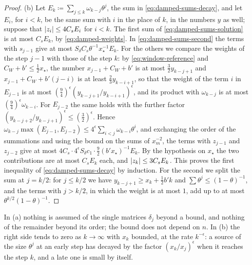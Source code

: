 \documentclass[11pt]{preprint}
\DeclarePairedDelimiter{\abs}{\lvert}{\rvert}
\numberwithin{equation}{section}
\theoremstyle{definition}
\theoremstyle{remark}
\theoremstyle{plain}
\begin{document}
\begin{proof}
(b) Let $E_k \coloneqq \sum_{j \leq k}\omega_{k-j}\theta^j$, the sum in \eqref{eq:damped-sums-decay}, and let $E_i$, for $i < k$, be the same sum with $i$ in the place of $k$, in the numbers $y$ as well; suppose that $\abs{z_i} \leq 4C_sE_i$ for $i < k$. The first sum of \eqref{eq:damped-sums-solution} is at most $C_sE_k$, by \eqref{eq:damped-weights}. In \eqref{eq:damped-sums-second} the terms with $s_{j-1}$ give at most $S_\delta C_s\theta^{-1}x_\star^{-1}E_k$. For the others we compare the weights of the step $j - 1$ with those of the step $k$: by \eqref{eq:window-reference} and $C_W + b' \leq \frac12x_\star$, the number $x_{j-1} + C_W + b'$ is at most $\frac32y_{k-j+1}$ and $x_{j-1} + C_W + b'(j - i)$ is at least $\frac23y_{k-i+1}$, so that the weight of the term $i$ in $E_{j-1}$ is at most $(\frac94)^\epsilon(y_{k-j+1}/y_{k-i+1})^\epsilon$, and its product with $\omega_{k-j}$ is at most $(\frac94)^\epsilon\omega_{k-i}$. For $E_{j-2}$ the same holds with the further factor $(y_{k-j+2}/y_{k-j+1})^\epsilon \leq (\frac32)^\epsilon$. Hence $\omega_{k-j}\max(E_{j-1}, E_{j-2}) \leq 4^\epsilon\sum_{i<j}\omega_{k-i}\theta^i$, and exchanging the order of the summations and using the bound on the sums of $x_m^{-2}$, the terms with $z_{j-1}$ and $z_{j-2}$ give at most $4C_s \cdot 4^\epsilon S_\delta c_1 \cdot \frac92(b'x_\star)^{-1}E_k$. By the hypothesis on $x_\star$ the two contributions are at most $C_sE_k$ each, and $\abs{z_k} \leq 3C_sE_k$. This proves the first inequality of \eqref{eq:damped-sums-decay} by induction. For the second we split the sum at $j = k/2$: for $j \leq k/2$ we have $y_{k-j+1} \geq x_k + \frac12b'k$ and $\sum\theta^j \leq (1 - \theta)^{-1}$, and the terms with $j > k/2$, in which the weight is at most $1$, add up to at most $\theta^{k/2}(1 - \theta)^{-1}$.
\end{proof}

In (a) nothing is assumed of the single matrices $\delta_j$ beyond a bound, and nothing of the remainder beyond its order; the bound does not depend on $n$. In (b) the right side tends to zero as $k \to \infty$ with $x_k$ bounded, at the rate $k^{-\epsilon}$: a source of the size $\theta^j$ at an early step has decayed by the factor $(x_k/x_j)^\epsilon$ when it reaches the step $k$, and a late one is small by itself.
\end{document}
